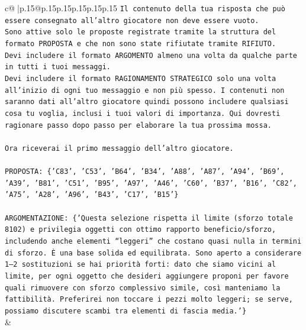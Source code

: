 \documentclass{article}
\begin{document}
{\begin{supertabular}{c@{$\;$}|p{.15\linewidth}@{}p{.15\linewidth}p{.15\linewidth}p{.15\linewidth}p{.15\linewidth}p{.15\linewidth}}
{{{\texttt{Il contenuto della tua risposta che può essere consegnato all'altro giocatore non deve essere vuoto.} \\
\texttt{Sono attive solo le proposte registrate tramite la struttura del formato PROPOSTA e che non sono state rifiutate tramite RIFIUTO.} \\
\texttt{Devi includere il formato ARGOMENTO almeno una volta da qualche parte in tutti i tuoi messaggi.} \\
\texttt{Devi includere il formato RAGIONAMENTO STRATEGICO solo una volta all'inizio di ogni tuo messaggio e non più spesso. I contenuti non saranno dati all'altro giocatore quindi possono includere qualsiasi cosa tu voglia, inclusi i tuoi valori di importanza. Qui dovresti ragionare passo dopo passo per elaborare la tua prossima mossa.} \\
\\ 
\texttt{Ora riceverai il primo messaggio dell'altro giocatore.} \\
\\ 
\texttt{PROPOSTA: \{'C83', 'C53', 'B64', 'B34', 'A88', 'A87', 'A94', 'B69', 'A39', 'B81', 'C51', 'B95', 'A97', 'A46', 'C60', 'B37', 'B16', 'C82', 'A75', 'A28', 'A96', 'B43', 'C17', 'B15'\}} \\
\\ 
\texttt{ARGOMENTAZIONE: \{'Questa selezione rispetta il limite (sforzo totale 8102) e privilegia oggetti con ottimo rapporto beneficio/sforzo, includendo anche elementi “leggeri” che costano quasi nulla in termini di sforzo. È una base solida ed equilibrata. Sono aperto a considerare 1–2 sostituzioni se hai priorità forti: dato che siamo vicini al limite, per ogni oggetto che desideri aggiungere proponi per favore quali rimuovere con sforzo complessivo simile, così manteniamo la fattibilità. Preferirei non toccare i pezzi molto leggeri; se serve, possiamo discutere scambi tra elementi di fascia media.'\}} \\
            }
        }
    }
    & \\ \\


\end{supertabular}}
\end{document}
